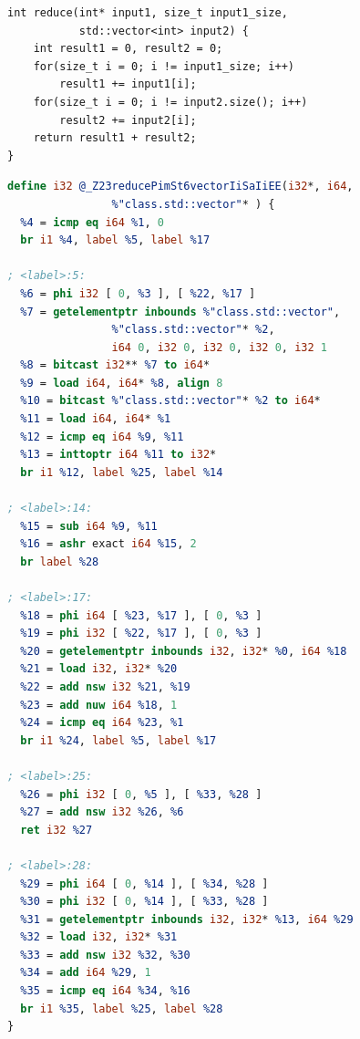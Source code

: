 \begin{figure}[p]
\begin{lstlisting}[language=MyCpp]
int reduce(int* input1, size_t input1_size,
           std::vector<int> input2) {
    int result1 = 0, result2 = 0;
    for(size_t i = 0; i != input1_size; i++)
        result1 += input1[i];
    for(size_t i = 0; i != input2.size(); i++)
        result2 += input2[i];
    return result1 + result2;
}
\end{lstlisting}
\begin{lstlisting}[language=LLVM,label={LLVMnormalisation},caption={
    Standard LLVM optimisations as normalising passes: The same computation is
    expressed with a plain C array and a C++ \texttt{std::vector} respectively.
    During compilation, the interaction of function inlining and loop-independent
    code motion results in equivalent intermediate representation code for the
    reduction loops at lines 24--32 and at lines 39--47.}]
define i32 @_Z23reducePimSt6vectorIiSaIiEE(i32*, i64,
                %"class.std::vector"* ) {
  %4 = icmp eq i64 %1, 0
  br i1 %4, label %5, label %17

; <label>:5:
  %6 = phi i32 [ 0, %3 ], [ %22, %17 ]
  %7 = getelementptr inbounds %"class.std::vector",
                %"class.std::vector"* %2,
                i64 0, i32 0, i32 0, i32 0, i32 1
  %8 = bitcast i32** %7 to i64*
  %9 = load i64, i64* %8, align 8
  %10 = bitcast %"class.std::vector"* %2 to i64*
  %11 = load i64, i64* %1
  %12 = icmp eq i64 %9, %11
  %13 = inttoptr i64 %11 to i32*
  br i1 %12, label %25, label %14

; <label>:14:
  %15 = sub i64 %9, %11
  %16 = ashr exact i64 %15, 2
  br label %28

; <label>:17:
  %18 = phi i64 [ %23, %17 ], [ 0, %3 ]
  %19 = phi i32 [ %22, %17 ], [ 0, %3 ]
  %20 = getelementptr inbounds i32, i32* %0, i64 %18
  %21 = load i32, i32* %20
  %22 = add nsw i32 %21, %19
  %23 = add nuw i64 %18, 1
  %24 = icmp eq i64 %23, %1
  br i1 %24, label %5, label %17

; <label>:25:
  %26 = phi i32 [ 0, %5 ], [ %33, %28 ]
  %27 = add nsw i32 %26, %6
  ret i32 %27

; <label>:28:
  %29 = phi i64 [ 0, %14 ], [ %34, %28 ]
  %30 = phi i32 [ 0, %14 ], [ %33, %28 ]
  %31 = getelementptr inbounds i32, i32* %13, i64 %29
  %32 = load i32, i32* %31
  %33 = add nsw i32 %32, %30
  %34 = add i64 %29, 1
  %35 = icmp eq i64 %34, %16
  br i1 %35, label %25, label %28
}
\end{lstlisting}
\end{figure}

